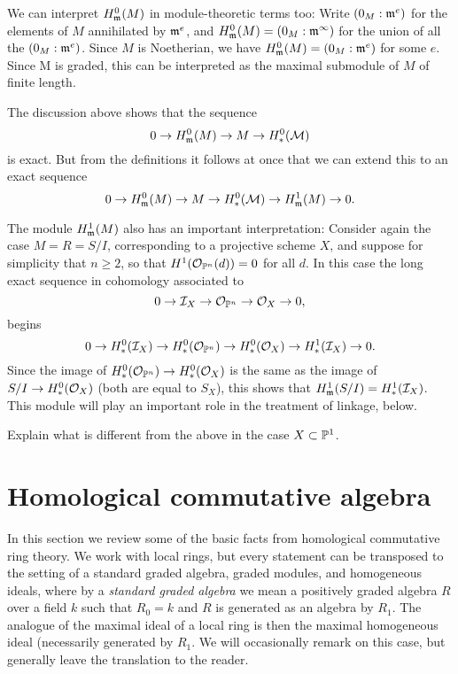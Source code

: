 We can interpret $H^{0}_{\mathfrak m}(M)$ in module-theoretic terms too: Write 
$(0_{M}:\mathfrak m^{e})$ for the elements of $M$ annihilated by $\mathfrak m^{e}$, and 
$H^{0}_{\mathfrak m}(M) =(0_{M}:\mathfrak m^{\infty})$ for the union of all the $(0_{M}:\mathfrak m^{e})$. Since $M$ is Noetherian, we have
$H^{0}_{\mathfrak m}(M) =(0_{M}:\mathfrak m^{e})$ for some $e$.  Since M is graded, this can be interpreted as the maximal submodule of $M$ of finite length. 

The discussion above shows that the sequence
$$
0 \to H^{0}_{\mathfrak m} (M) \to M\to H^{0}_{*}({\mathcal M})
$$
is exact. But from the definitions it follows at once that we can extend this to an exact sequence
$$
0 \to H^{0}_{\mathfrak m} (M) \to M\to H^{0}_{*}({\mathcal M}) \to H^{1}_{\mathfrak m} (M) \to 0.
$$

The module $H^{1}_{\mathfrak m}(M)$ also has an important interpretation: Consider again the case $M = R = S/I$, corresponding to a projective scheme $X$, and suppose for simplicity that 
$n\geq 2$, so that $H^{1}({\mathcal O}_{{\mathbb P}^{n}}(d)) = 0$ for all $d$. In this case the long exact sequence in cohomology associated to 
$$
0\to {\mathcal I}_{X} \to {\mathcal O}_{{\mathbb P}^{n}} \to {\mathcal O}_{X}\to 0,
$$
begins
$$
0\to H^{0}_{*}({\mathcal I}_{X}) \to H^{0}_{*}({\mathcal O}_{{\mathbb P}^{n}}) \to H^{0}_{*}({\mathcal O}_{X})\to H^{1}_{*}({\mathcal I}_{X}) \to 0.
$$
Since the image of $H^{0}_{*}({\mathcal O}_{{\mathbb P}^{n}}) \to H^{0}_{*}({\mathcal O}_{X})$ is  the same as
the image of $S/I \to H^{0}_{*}({\mathcal O}_{X})$ (both are equal to $S_{X}$), 
this shows that $H^{1}_{\mathfrak m}(S/I) = H^{1}_{*}({\mathcal I}_{X})$. This module will play an important role in the treatment of linkage, below.

\begin{exercise}
 Explain what is different from the above in the case $X\subset {\mathbb P}^{1}$.
\end{exercise}

\section{Homological commutative algebra} 


In this section we review some of the basic facts from homological commutative ring theory. We work
with local rings, but every statement can be transposed to the setting of a standard graded algebra, graded modules, and homogeneous ideals, where by a \emph{standard graded algebra} we mean a positively graded algebra $R$ over a field $k$ such that $R_{0} = k$ and $R$ is generated as an algebra by $R_{1}$. The analogue of the maximal ideal of a local ring is then the maximal homogeneous ideal (necessarily generated by $R_{1}$. We will occasionally remark on this case, but generally leave the translation to the reader.

